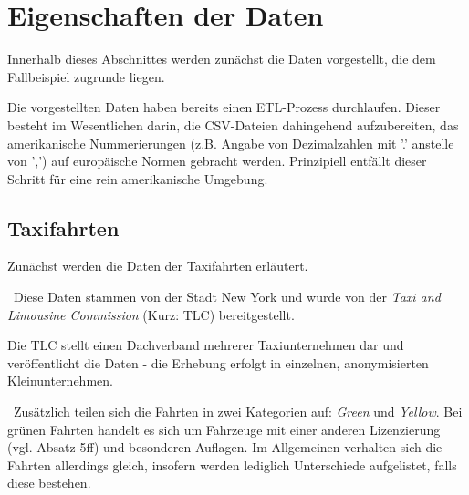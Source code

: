 \section{Eigenschaften der Daten}
\label{sec:Daten}
Innerhalb dieses Abschnittes werden zunächst die Daten vorgestellt, die dem Fallbeispiel zugrunde liegen. 

Die vorgestellten Daten haben bereits einen ETL-Prozess durchlaufen. Dieser besteht im Wesentlichen darin, die CSV-Dateien dahingehend aufzubereiten, das amerikanische Nummerierungen (z.B. Angabe von Dezimalzahlen mit '.' anstelle von ',') auf europäische Normen gebracht werden. Prinzipiell entfällt dieser Schritt für eine rein amerikanische Umgebung. 
\subsection{Taxifahrten}
\label{subsec:Taxidaten}
Zunächst werden die Daten der Taxifahrten erläutert. 

~\newline Diese Daten stammen von der Stadt New York \cite{SourceTaxi} und wurde von der \textit{Taxi and Limousine Commission} (Kurz: TLC) bereitgestellt. 

Die TLC stellt einen Dachverband mehrerer Taxiunternehmen dar und veröffentlicht die Daten - die Erhebung erfolgt in einzelnen, anonymisierten Kleinunternehmen. 

~\newline Zusätzlich teilen sich die Fahrten in zwei Kategorien auf: \textit{Green} und \textit{Yellow}. Bei grünen Fahrten handelt es sich um Fahrzeuge mit einer anderen Lizenzierung (vgl. \cite{GreenTaxis} Absatz 5ff) und besonderen Auflagen. Im Allgemeinen verhalten sich die Fahrten allerdings gleich, insofern werden lediglich Unterschiede aufgelistet, falls diese bestehen.
